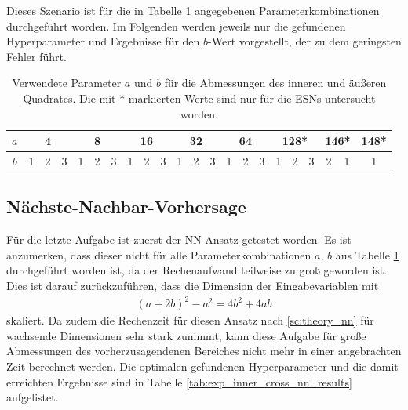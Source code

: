 Dieses Szenario ist für die in Tabelle \ref{tab:exp_inner_cross_pred_parameter} angegebenen Parameterkombinationen durchgeführt worden. Im Folgenden werden jeweils nur die gefundenen Hyperparameter und Ergebnisse für den $b$-Wert vorgestellt, der zu dem geringsten Fehler führt.

\begin{table}[h]
	\centering
	\begin{tabular}{cccc|ccc|ccc|ccc|ccc|ccc|cc|c}
		\hline
		$a$ & \multicolumn{3}{c|}{4} & \multicolumn{3}{c|}{8} & \multicolumn{3}{c|}{16} & \multicolumn{3}{c|}{32} & \multicolumn{3}{c|}{64} & \multicolumn{3}{c|}{128*} & \multicolumn{2}{c|}{146*} & 148* \\
		\hline
		$b$ & 1 & 2 & 3 & 1 & 2 & 3 & 1 & 2 & 3 & 1 & 2 & 3 & 1 & 2 & 3 & 1 & 2 & 3 & 2 & 1 & 1 \\
		\hline
	\end{tabular} 
	\caption{Verwendete Parameter $a$ und $b$ für die Abmessungen des inneren und äußeren Quadrates. Die mit * markierten Werte sind nur für die \textsc{ESN}s untersucht worden.}
	\label{tab:exp_inner_cross_pred_parameter}
\end{table} 

\subsection{Nächste-Nachbar-Vorhersage}
Für die letzte Aufgabe ist zuerst der \textsc{NN}-Ansatz getestet worden. Es ist anzumerken, dass dieser nicht für alle Parameterkombinationen $a$, $b$ aus Tabelle \ref{tab:exp_inner_cross_pred_parameter} durchgeführt worden ist, da der Rechenaufwand teilweise zu groß geworden ist. Dies ist darauf zurückzuführen, dass die Dimension der Eingabevariablen mit
\begin{align*}
(a+2b)^2-a^2 = 4b^2+4ab
\end{align*}
skaliert. Da zudem die Rechenzeit für diesen Ansatz nach \ref{sc:theory_nn} für wachsende Dimensionen sehr stark zunimmt, kann diese Aufgabe für große Abmessungen des vorherzusagendenen Bereiches nicht mehr in einer angebrachten Zeit berechnet werden.
Die optimalen gefundenen Hyperparameter und die damit erreichten Ergebnisse sind in Tabelle \ref{tab:exp_inner_cross_nn_results} aufgelistet.

